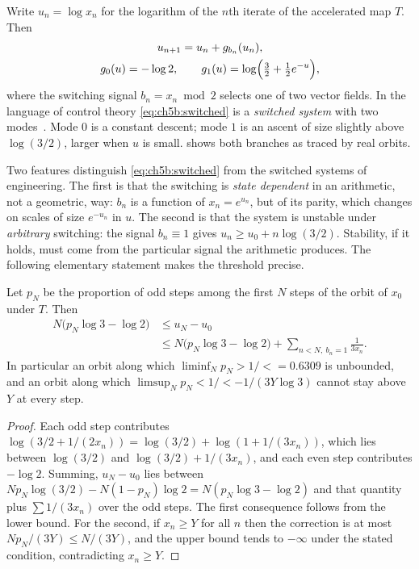 Write $u_n=\log x_n$ for the logarithm of the $n$th iterate of the accelerated
map $T$. Then
\begin{equation}\label{eq:ch5b:switched}
\begin{gathered}
  u_{n+1}=u_n+g_{b_n}(u_n),\\
  g_0(u)=-\log2,\qquad g_1(u)=\log\Bigl(\tfrac32+\tfrac12e^{-u}\Bigr),
\end{gathered}
\end{equation}
where the switching signal $b_n=x_n\bmod2$ selects one of two vector fields.
In the language of control theory \eqref{eq:ch5b:switched} is a \emph{switched
system} with two modes~\cite{liberzon2003}. Mode $0$ is a constant descent;
mode $1$ is an ascent of size slightly above $\log(3/2)$, larger when $u$ is
small.  shows both branches as traced by real orbits.

Two features distinguish \eqref{eq:ch5b:switched} from the switched systems of
engineering. The first is that the switching is \emph{state dependent} in an
arithmetic, not a geometric, way: $b_n$ is a function of $x_n=e^{u_n}$, but
of its parity, which changes on scales of size $e^{-u_n}$ in $u$. The second
is that the system is unstable under \emph{arbitrary} switching: the signal
$b_n\equiv1$ gives $u_n\ge u_0+n\log(3/2)$. Stability, if it holds, must come
from the particular signal the arithmetic produces. The following elementary
statement makes the threshold precise.

\begin{proposition}\label{prop:ch5b:freq}
Let $p_N$ be the proportion of odd steps among the first $N$ steps of the
orbit of $x_0$ under $T$. Then
\begin{align*}
  N\bigl(p_N\log3-\log2\bigr)&\le u_N-u_0\\
  &\le N\bigl(p_N\log3-\log2\bigr)+\sum_{n<N,\ b_n=1}\frac{1}{3x_n}.
\end{align*}
In particular an orbit along which $\liminf_Np_N>1/\lt=0.6309$ is unbounded,
and an orbit along which $\limsup_Np_N<1/\lt-1/(3Y\log3)$ cannot stay above $Y$ at every step.
\end{proposition}

\begin{proof}
Each odd step contributes $\log(3/2+1/(2x_n))=\log(3/2)+\log(1+1/(3x_n))$,
which lies between $\log(3/2)$ and $\log(3/2)+1/(3x_n)$, and each even step
contributes $-\log2$. Summing, $u_N-u_0$ lies between
$Np_N\log(3/2)-N(1-p_N)\log2=N(p_N\log3-\log2)$ and that quantity plus
$\sum1/(3x_n)$ over the odd steps. The first consequence follows from the lower
bound. For the second, if $x_n\ge Y$ for all $n$ then the correction is at most
$Np_N/(3Y)\le N/(3Y)$, and the upper bound tends to $-\infty$ under the stated
condition, contradicting $x_n\ge Y$.
\end{proof}


